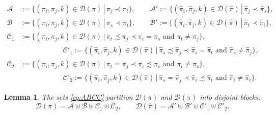 \documentclass[12pt]{amsart}
\newtheorem{lem}[thm]{Lemma}
\theoremstyle{definition}
\numberwithin{equation}{section}
\newcommand{\A}{\mathcal{A}}
\newcommand{\B}{\mathcal{B}}
\newcommand{\C}{\mathcal{C}}
\newcommand{\D}{\mathcal{D}}
\newcommand{\defeq}{:=}
\begin{document}
\begin{equation}\label{eq:ABCC}
    \begin{aligned}
        \A &\defeq \{ (\pi_i,\pi_j,k) \in \D(\pi) \,|\, \pi_j \prec \pi_t \}, \qquad
        \A' \defeq \{ (\hat \pi_i,\hat \pi_j,k) \in \D(\hat \pi) \,|\, \hat \pi_j \prec \hat \pi_s \},\\
        \B &\defeq \{ (\pi_i,\pi_j,k) \in \D(\pi) \,|\, \pi_s \prec \pi_i \}, \qquad
        \B' \defeq \{ (\hat\pi_i,\hat\pi_j,k) \in \D(\hat\pi) \,|\, \hat\pi_t \prec \hat\pi_i \},\\
        \C_1 &\defeq \{ (\pi_i,\pi_j,k) \in \D(\pi) \,|\, \pi_t\precsim\pi_j\prec \pi_i=\pi_s \text{ and } \pi_t\neq \pi_j \},\\
        &\qquad\qquad\qquad 
        \C'_1 \defeq \{ (\hat\pi_i,\hat\pi_j,k) \in \D(\hat\pi) \,|\, \hat\pi_s\precsim\hat\pi_j\prec \hat\pi_i=\hat\pi_t \text{ and } \hat\pi_s\neq \hat\pi_j \},\\
        \C_2 &\defeq \{ (\pi_i,\pi_j,k) \in \D(\pi) \,|\, \pi_t=\pi_j\prec \pi_i\precsim \pi_s \text{ and } \pi_i\neq \pi_s \},\\
        &\qquad\qquad\qquad 
        \C'_2 \defeq \{ (\hat\pi_i,\hat\pi_j,k) \in \D(\hat\pi) \,|\, \hat\pi_s=\hat\pi_j\prec \hat\pi_i\precsim \hat\pi_t \text{ and } \hat\pi_i\neq \hat\pi_t \}.
    \end{aligned}
\end{equation}
\begin{lem}\label{l:ABCD}
    The sets \eqref{eq:ABCC} partition $\D(\pi)$ and $\D(\hat\pi)$ into disjoint blocks:
    \begin{equation}\label{eq:blocks}
        \D(\pi) = \A \uplus \B \uplus \C_1 \uplus \C_2,
        \qquad
        \D(\hat\pi) = \A' \uplus \B' \uplus \C'_1 \uplus \C'_2.
    \end{equation}
\end{lem}
\end{document}
